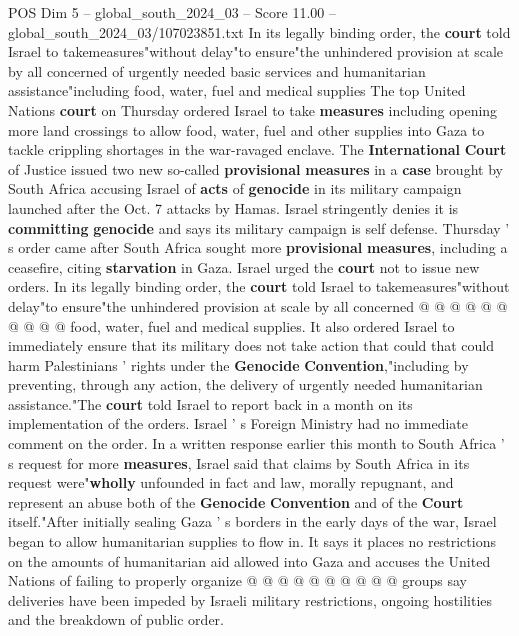 \begin{textsample}{POS Dim 5 – global\_south\_2024\_03 – Score 11.00 – global\_south\_2024\_03/107023851.txt}  \label{ex:f5_pos_247}
In its legally binding order, the \textbf{court} told Israel to takemeasures"without delay"to ensure"the unhindered provision at scale by all concerned of urgently needed basic services and humanitarian assistance"including food, water, fuel and medical supplies The top United Nations \textbf{court} on Thursday ordered Israel to take \textbf{measures} including opening more land crossings to allow food, water, fuel and other supplies into Gaza to tackle crippling shortages in the war-ravaged enclave.
The \textbf{International} \textbf{Court} of Justice issued two new so-called \textbf{provisional} \textbf{measures} in a \textbf{case} brought by South Africa accusing Israel of \textbf{acts} of \textbf{genocide} in its military campaign launched after the Oct. 7 attacks by Hamas.
Israel stringently denies it is \textbf{committing} \textbf{genocide} and says its military campaign is self defense.
Thursday ' s order came after South Africa sought more \textbf{provisional} \textbf{measures}, including a ceasefire, citing \textbf{starvation} in Gaza.
Israel urged the \textbf{court} not to issue new orders.
In its legally binding order, the \textbf{court} told Israel to takemeasures"without delay"to ensure"the unhindered provision at scale by all concerned @ @ @ @ @ @ @ @ @ @ food, water, fuel and medical supplies.
It also ordered Israel to immediately ensure that its military does not take action that could that could harm Palestinians ' rights under the \textbf{Genocide} \textbf{Convention},"including by preventing, through any action, the delivery of urgently needed humanitarian assistance."The \textbf{court} told Israel to report back in a month on its implementation of the orders.
Israel ' s Foreign Ministry had no immediate comment on the order.
In a written response earlier this month to South Africa ' s request for more \textbf{measures}, Israel said that claims by South Africa in its request were"\textbf{wholly} unfounded in fact and law, morally repugnant, and represent an abuse both of the \textbf{Genocide} \textbf{Convention} and of the \textbf{Court} itself."After initially sealing Gaza ' s borders in the early days of the war, Israel began to allow humanitarian supplies to flow in.
It says it places no restrictions on the amounts of humanitarian aid allowed into Gaza and accuses the United Nations of failing to properly organize @ @ @ @ @ @ @ @ @ @ groups say deliveries have been impeded by Israeli military restrictions, ongoing hostilities and the breakdown of public order.

\end{textsample}
